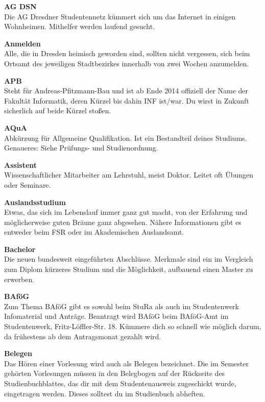 \twocolumn


\textbf{AG DSN} \\
Die AG Dresdner Studentennetz kümmert sich um das Internet in einigen Wohnheimen.
Mithelfer werden laufend gesucht.

\textbf{Anmelden} \\
Alle, die in Dresden heimisch geworden sind, sollten nicht vergessen, sich beim Ortsamt des jeweiligen Stadtbezirkes innerhalb von zwei Wochen anzumelden.

\textbf{APB} \\
Steht für Andreas-Pfitzmann-Bau und ist ab Ende 2014 offiziell der Name der Fakultät Informatik, deren Kürzel bis dahin INF ist/war. Du wirst in Zukunft sicherlich auf beide Kürzel stoßen.

\textbf{AQuA} \\
Abkürzung für Allgemeine Qualifikation.
Ist ein Bestandteil deines Studiums.
Genaueres:
Siehe Prüfungs- und Studienordnung.

\textbf{Assistent} \\
Wissenschaftlicher Mitarbeiter am Lehrstuhl, meist Doktor.
Leitet oft Übungen oder Seminare.

\textbf{Auslandsstudium} \\
Etwas, das sich im Lebenslauf immer ganz gut macht, von der Erfahrung und möglicherweise guten Bräune ganz abgesehen.
Nähere Informationen gibt es entweder beim FSR oder im Akademischen Auslandsamt.

\textbf{Bachelor} \\
Die neuen bundesweit eingeführten Abschlüsse.
Merkmale sind ein im Vergleich zum Diplom kürzeres Studium und die Möglichkeit, aufbauend einen Master zu erwerben.

\textbf{BAföG} \\
Zum Thema BAföG gibt es sowohl beim StuRa als auch im Studentenwerk Infomaterial und Anträge.
Beantragt wird BAföG beim BAföG-Amt im Studentenwerk, Fritz-Löffler-Str. 18.
Kümmere dich so schnell wie möglich darum, da frühestens ab dem Antragsmonat gezahlt wird.

\textbf{Belegen} \\
Das Hören einer Vorlesung wird auch als Belegen bezeichnet.
Die im Semester gehörten Vorlesungen müssen in den Belegbogen auf der Rückseite des Studienbuchblattes, das dir mit dem Studentenausweis zugeschickt wurde, eingetragen werden.
Dieses solltest du im Studienbuch abheften.


